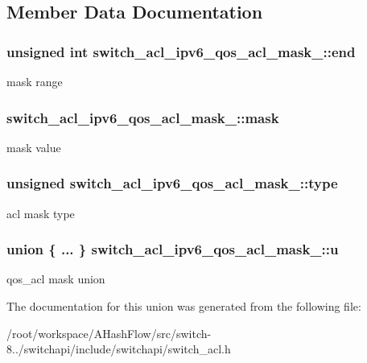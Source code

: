\subsection{Member Data Documentation}
\hypertarget{unionswitch__acl__ipv6__qos__acl__mask___a58d90227f22c4c325a4e42fb9c4f1e09}{
\subsubsection[{end}]{\setlength{\rightskip}{0pt plus 5cm}unsigned int switch\+\_\+acl\+\_\+ipv6\+\_\+qos\+\_\+acl\+\_\+mask\+\_\+\+::end}}\label{unionswitch__acl__ipv6__qos__acl__mask___a58d90227f22c4c325a4e42fb9c4f1e09}
mask range \hypertarget{unionswitch__acl__ipv6__qos__acl__mask___a9515317a2471dc7abccf77b19ca1375c}{
\subsubsection[{mask}]{ switch\+\_\+acl\+\_\+ipv6\+\_\+qos\+\_\+acl\+\_\+mask\+\_\+\+::mask}}\label{unionswitch__acl__ipv6__qos__acl__mask___a9515317a2471dc7abccf77b19ca1375c}
mask value \hypertarget{unionswitch__acl__ipv6__qos__acl__mask___ada101bb9893742bd180456e149906a3c}{
\subsubsection[{type}]{\setlength{\rightskip}{0pt plus 5cm}unsigned switch\+\_\+acl\+\_\+ipv6\+\_\+qos\+\_\+acl\+\_\+mask\+\_\+\+::type}}\label{unionswitch__acl__ipv6__qos__acl__mask___ada101bb9893742bd180456e149906a3c}
acl mask type \hypertarget{unionswitch__acl__ipv6__qos__acl__mask___ad2f9b60a5cd2ebad830476deb9c6894c}{
\subsubsection[{u}]{\setlength{\rightskip}{0pt plus 5cm}union \{ ... \}   switch\+\_\+acl\+\_\+ipv6\+\_\+qos\+\_\+acl\+\_\+mask\+\_\+\+::u}}\label{unionswitch__acl__ipv6__qos__acl__mask___ad2f9b60a5cd2ebad830476deb9c6894c}
qos\+\_\+acl mask union 

The documentation for this union was generated from the following file\+:\begin{DoxyCompactItemize}
\item 
/root/workspace/\+A\+Hash\+Flow/src/switch-\/8../switchapi/include/switchapi/switch\+\_\+acl.\+h\end{DoxyCompactItemize}
